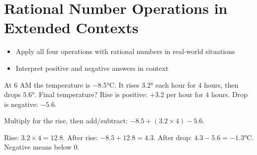 \section{Rational Number Operations in Extended Contexts}

\begin{stepGoal}
\begin{itemize}
    \item Apply all four operations with rational numbers in real-world situations
    \item Interpret positive and negative answers in context
\end{itemize}
\end{stepGoal}

\begin{stepVocabBox}
\end{stepVocabBox}

\begin{stepsCard}
\end{stepsCard}

\begin{stepExample}{At $6$ AM the temperature is $-8.5°$C. It rises $3.2°$ each hour for $4$ hours, then drops $5.6°$. Final temperature?}
     Rise is positive: $+3.2$ per hour for $4$ hours. Drop is negative: $-5.6$.

     Multiply for the rise, then add/subtract: $-8.5 + (3.2 \times 4) - 5.6$.

     Rise: $3.2 \times 4 = 12.8$. After rise: $-8.5 + 12.8 = 4.3$. After drop: $4.3 - 5.6 = -1.3°$C. Negative means below $0$.
\end{stepExample}

